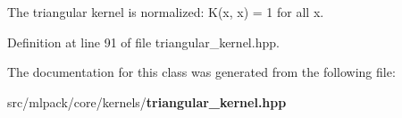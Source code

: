 The triangular kernel is normalized\-: K(x, x) = 1 for all x. 



Definition at line 91 of file triangular\-\_\-kernel.\-hpp.



The documentation for this class was generated from the following file\-:\begin{DoxyCompactItemize}
\item 
src/mlpack/core/kernels/{\bf triangular\-\_\-kernel.\-hpp}\end{DoxyCompactItemize}
